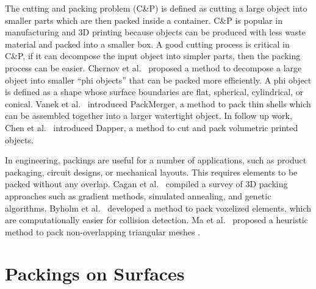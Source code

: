 \newtext
{
The cutting and packing problem (C\&P) is defined as cutting a large object into smaller parts 
which are then packed inside a container.
C\&P is popular in manufacturing and 3D printing because
objects can be produced with less waste material and packed into a smaller box.
A good cutting process is critical in C\&P, if it can decompose the input object
into simpler parts, then the packing process can be easier.
Chernov et al.~\cite{Chernov2010} proposed a method to decompose a large object
into smaller ``phi objects'' that can be packed more efficiently.
A phi object is defined as a shape whose surface boundaries 
are flat, spherical, cylindrical, or conical.
Vanek et al.~\cite{Vanek2014} introduced PackMerger,
a method to pack thin shells which can be assembled together into
a larger watertight object.
In follow up work, Chen et al.~\cite{Chen2015} introduced Dapper,
a method to cut and pack volumetric printed objects.
}

\newtext
{
In engineering, packings are useful for a number of applications, 
such as product packaging, circuit designs, or mechanical layouts.
This requires elements to be packed without any overlap.
Cagan et al.~\cite{Cagan2002} compiled a survey of 3D packing approaches such as
gradient methods, simulated annealing, and genetic algorithms.
Byholm et al.~\cite{Byholm2009} developed a method
to pack voxelized elements, which are computationally easier for collision detection.
Ma et al.~\cite{Ma2018} proposed a heuristic method to pack non-overlapping triangular meshes 
.
}



\section{Packings on Surfaces}

